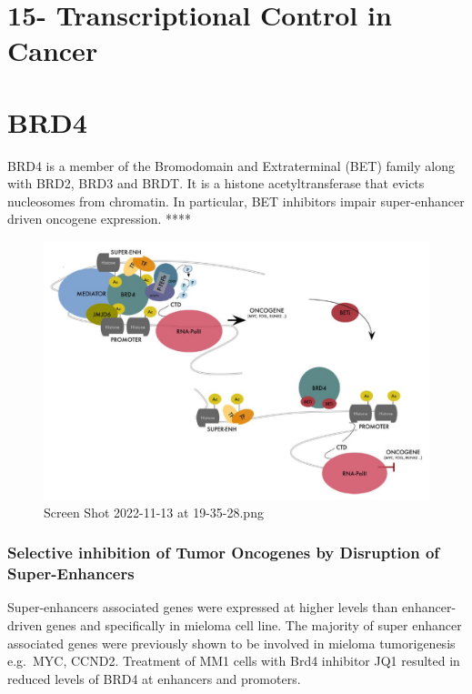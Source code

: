 \hypertarget{transcriptional-control-in-cancer}{%
\section{15- Transcriptional Control in Cancer}\label{transcriptional-control-in-cancer}}

\hypertarget{brd4}{%
\section{BRD4}\label{brd4}}

BRD4 is a member of the Bromodomain and Extraterminal (BET) family along
with BRD2, BRD3 and BRDT. It is a histone acetyltransferase that evicts nucleosomes from chromatin. In particular, BET inhibitors impair super-enhancer driven oncogene expression.
****

\begin{figure}
\centering
\includegraphics{../_resources/Screen_Shot_2022-11-13_at_19-35-28.png}
\caption{Screen Shot 2022-11-13 at 19-35-28.png}
\end{figure}

\hypertarget{selective-inhibition-of-tumor-oncogenes-by-disruption-of-super-enhancers}{%
\subsubsection{Selective inhibition of Tumor Oncogenes by Disruption of Super-Enhancers}\label{selective-inhibition-of-tumor-oncogenes-by-disruption-of-super-enhancers}}

Super-enhancers associated genes were expressed at higher levels than enhancer-driven genes and specifically in mieloma cell line. The majority of super enhancer associated genes were previously shown to be involved in mieloma tumorigenesis e.g.~MYC, CCND2. Treatment of MM1 cells with Brd4 inhibitor JQ1 resulted in reduced levels of BRD4 at enhancers and promoters.

